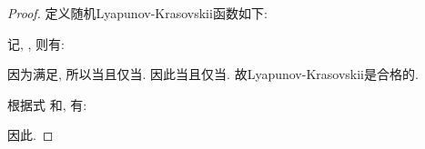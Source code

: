         \begin{proof}
        定义随机Lyapunov-Krasovskii函数如下:
        \begin{comment}
        V(t)=\frac{1}{2}\hat{e}^\top(t)\hat{e}(t).
        \end{comment}
        记, , 则有:
        \begin{comment}\label{ekt}
        \hat{e}^\top(t)\hat{e}(t)=e^\top(t)[L^2_u\otimes I_n]e(t)=\sum_{k=1}^ne^k(t)^\top L^2_ue^k(t).
        \end{comment}
        因为满足, 所以当且仅当.
        因此当且仅当. 故Lyapunov-Krasovskii是合格的.

        根据式  和, 有:
        \begin{comment}
        \hat{e}^\top(t)\hat{e}(t)=\sum_{k=1}^ne^k(t)^\top L^2_ue^k(t)\geq\lambda_2^2\sum_{k=1}^ne^k(t)^\top e^k(t)=\lambda_2^2e^\top(t)e(t).
        \end{comment}
        因此.


\end{proof}
